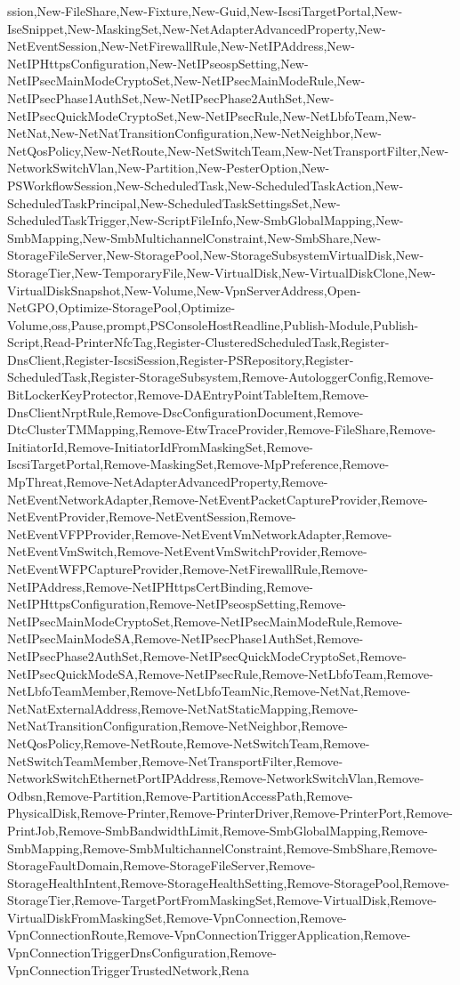 {{ssion,New-FileShare,New-Fixture,New-Guid,New-IscsiTargetPortal,New-IseSnippet,New-MaskingSet,New-NetAdapterAdvancedProperty,New-NetEventSession,New-NetFirewallRule,New-NetIPAddress,New-NetIPHttpsConfiguration,New-NetIPseospSetting,New-NetIPsecMainModeCryptoSet,New-NetIPsecMainModeRule,New-NetIPsecPhase1AuthSet,New-NetIPsecPhase2AuthSet,New-NetIPsecQuickModeCryptoSet,New-NetIPsecRule,New-NetLbfoTeam,New-NetNat,New-NetNatTransitionConfiguration,New-NetNeighbor,New-NetQosPolicy,New-NetRoute,New-NetSwitchTeam,New-NetTransportFilter,New-NetworkSwitchVlan,New-Partition,New-PesterOption,New-PSWorkflowSession,New-ScheduledTask,New-ScheduledTaskAction,New-ScheduledTaskPrincipal,New-ScheduledTaskSettingsSet,New-ScheduledTaskTrigger,New-ScriptFileInfo,New-SmbGlobalMapping,New-SmbMapping,New-SmbMultichannelConstraint,New-SmbShare,New-StorageFileServer,New-StoragePool,New-StorageSubsystemVirtualDisk,New-StorageTier,New-TemporaryFile,New-VirtualDisk,New-VirtualDiskClone,New-VirtualDiskSnapshot,New-Volume,New-VpnServerAddress,Open-NetGPO,Optimize-StoragePool,Optimize-Volume,oss,Pause,prompt,PSConsoleHostReadline,Publish-Module,Publish-Script,Read-PrinterNfcTag,Register-ClusteredScheduledTask,Register-DnsClient,Register-IscsiSession,Register-PSRepository,Register-ScheduledTask,Register-StorageSubsystem,Remove-AutologgerConfig,Remove-BitLockerKeyProtector,Remove-DAEntryPointTableItem,Remove-DnsClientNrptRule,Remove-DscConfigurationDocument,Remove-DtcClusterTMMapping,Remove-EtwTraceProvider,Remove-FileShare,Remove-InitiatorId,Remove-InitiatorIdFromMaskingSet,Remove-IscsiTargetPortal,Remove-MaskingSet,Remove-MpPreference,Remove-MpThreat,Remove-NetAdapterAdvancedProperty,Remove-NetEventNetworkAdapter,Remove-NetEventPacketCaptureProvider,Remove-NetEventProvider,Remove-NetEventSession,Remove-NetEventVFPProvider,Remove-NetEventVmNetworkAdapter,Remove-NetEventVmSwitch,Remove-NetEventVmSwitchProvider,Remove-NetEventWFPCaptureProvider,Remove-NetFirewallRule,Remove-NetIPAddress,Remove-NetIPHttpsCertBinding,Remove-NetIPHttpsConfiguration,Remove-NetIPseospSetting,Remove-NetIPsecMainModeCryptoSet,Remove-NetIPsecMainModeRule,Remove-NetIPsecMainModeSA,Remove-NetIPsecPhase1AuthSet,Remove-NetIPsecPhase2AuthSet,Remove-NetIPsecQuickModeCryptoSet,Remove-NetIPsecQuickModeSA,Remove-NetIPsecRule,Remove-NetLbfoTeam,Remove-NetLbfoTeamMember,Remove-NetLbfoTeamNic,Remove-NetNat,Remove-NetNatExternalAddress,Remove-NetNatStaticMapping,Remove-NetNatTransitionConfiguration,Remove-NetNeighbor,Remove-NetQosPolicy,Remove-NetRoute,Remove-NetSwitchTeam,Remove-NetSwitchTeamMember,Remove-NetTransportFilter,Remove-NetworkSwitchEthernetPortIPAddress,Remove-NetworkSwitchVlan,Remove-Odbsn,Remove-Partition,Remove-PartitionAccessPath,Remove-PhysicalDisk,Remove-Printer,Remove-PrinterDriver,Remove-PrinterPort,Remove-PrintJob,Remove-SmbBandwidthLimit,Remove-SmbGlobalMapping,Remove-SmbMapping,Remove-SmbMultichannelConstraint,Remove-SmbShare,Remove-StorageFaultDomain,Remove-StorageFileServer,Remove-StorageHealthIntent,Remove-StorageHealthSetting,Remove-StoragePool,Remove-StorageTier,Remove-TargetPortFromMaskingSet,Remove-VirtualDisk,Remove-VirtualDiskFromMaskingSet,Remove-VpnConnection,Remove-VpnConnectionRoute,Remove-VpnConnectionTriggerApplication,Remove-VpnConnectionTriggerDnsConfiguration,Remove-VpnConnectionTriggerTrustedNetwork,Rena}}
